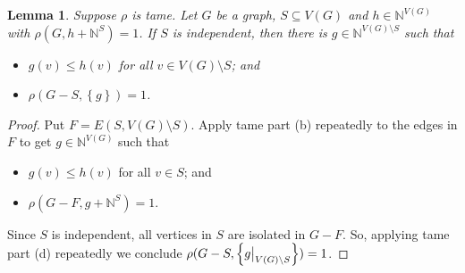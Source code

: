 \documentclass[12pt]{article}
\theoremstyle{plain}
\newtheorem{lem}[thm]{Lemma}
\theoremstyle{definition}
\theoremstyle{remark}
\newcommand{\IN}{\mathbb{N}}
\newcommand{\set}[1]{\left\{ #1 \right\}}
\newcommand\restr[2]{{%
  \left.\kern-\nulldelimiterspace %
  #1 %
  \vphantom{\big|} %
  \right|_{#2} %
  }}
\begin{document}
\begin{lem}\label{CutOff}
	Suppose $\rho$ is tame. Let $G$ be a graph, $S \subseteq V(G)$ and $h \in \IN^{V(G)}$ with $\rho(G, h + \IN^S) = 1$.  If $S$ is independent, then there is $g \in \IN^{V(G) \setminus S}$ such that
	\begin{itemize}
		\item $g(v) \le h(v)$ for all $v \in V(G) \setminus S$; and
		\item $\rho(G - S, \set{g}) = 1$.
	\end{itemize}
\end{lem}
\begin{proof}
	Put $F = E(S, V(G) \setminus S)$. Apply tame part (b) repeatedly to the edges in $F$ to get $g \in \IN^{V(G)}$ such that
	\begin{itemize}
		\item $g(v) \le h(v)$ for all $v \in S$; and
		\item $\rho(G - F, g + \IN^S) = 1$.
	\end{itemize}
	Since $S$ is independent, all vertices in $S$ are isolated in $G-F$.  So, applying tame part (d) repeatedly we conclude $\rho(G - S, \set{\restr{g}{V(G) \setminus S}}) = 1$.
\end{proof}
\end{document}
